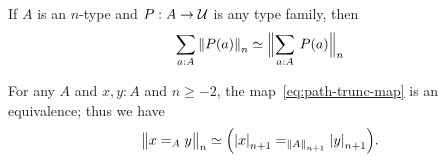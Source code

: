 \documentclass[hott-all.tex]{subfiles}
\begin{document}
% 
\begin{cor}
  If $A$ is an $n$-type and $P:A\to\type$ is any type family, then
  \[ \eqv{\sm{a:A} \trunc n{P(a)}}{\Trunc n{\sm{a:A}P(a)}} \]
\end{cor}
% 
% 
\begin{thm} 
  For any $A$ and $x,y:A$ and $n\ge -2$, the map~\eqref{eq:path-trunc-map} is an equivalence; thus we have
  \[ \eqv{\ttrunc n{x=_Ay}}{\Big(\tproj {n+1}x=_{\trunc{n+1}A}\tproj {n+1}y\Big)}. \]
\end{thm}
% 
\end{document}
